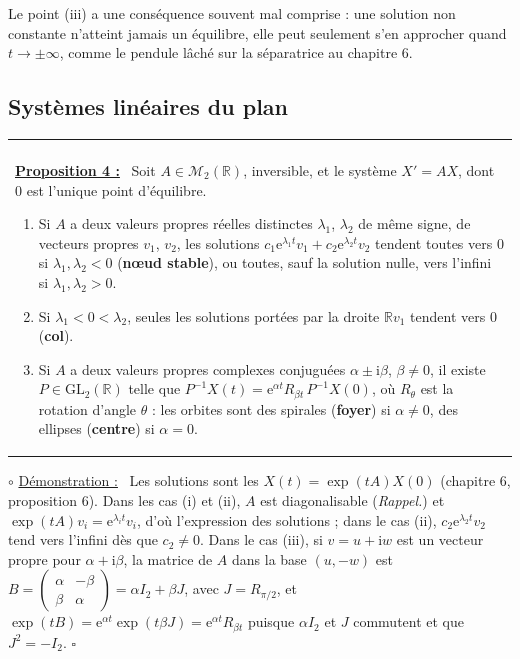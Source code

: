 \documentclass[a4paper,twoside]{report}
\makeatletter
\newcommand{\mot}[1]{\textcolor{rougecours}{\textbf{#1}}}
\newenvironment{cadre}%
 {\par\vspace{2mm}\noindent\begin{tabular}{|@{\hspace{4mm}}p{0.93\textwidth}@{\hspace{4mm}}|}
  \hline \\[-2mm]}%
 {\\[2mm] \hline \end{tabular}\par\vspace{3mm}}
\newcommand{\propo}[1]{\textbf{\underline{Proposition #1 :}}~}
\newenvironment{demo}%
 {\par\needspace{4\baselineskip}\vspace{1mm}\noindent$\circ$ \underline{Démonstration :}~\setlength{\parskip}{3pt plus 1pt}}%
 {\hfill$\square$\par\vspace{2mm}}
\newcommand{\R}{\mathbb{R}}
\newcommand{\ee}{\mathrm{e}}                      %
\newcommand{\ii}{\mathrm{i}}                      %
\newcommand{\GL}{\mathrm{GL}}                     %
\makeatother
\begin{document}
\noindent Le point (iii) a une conséquence souvent mal comprise : une solution non constante n'atteint jamais un équilibre, elle peut seulement s'en approcher quand $t \to \pm\infty$, comme le pendule lâché sur la séparatrice au chapitre 6.

\subsection{Systèmes linéaires du plan}

\begin{cadre}
\propo{4} Soit $A \in \mathcal{M}_{2}(\R)$, inversible, et le système $X' = AX$, dont $0$ est l'unique point d'équilibre.
\begin{enumerate}[label=(\roman*),topsep=3pt,itemsep=3pt]
  \item Si $A$ a deux valeurs propres réelles distinctes $\lambda_{1}$, $\lambda_{2}$ de même signe, de vecteurs propres $v_{1}$, $v_{2}$, les solutions $c_{1}\ee^{\lambda_{1}t}v_{1} + c_{2}\ee^{\lambda_{2}t}v_{2}$ tendent toutes vers $0$ si $\lambda_{1}, \lambda_{2} < 0$ (\mot{nœud stable}), ou toutes, sauf la solution nulle, vers l'infini si $\lambda_{1}, \lambda_{2} > 0$.
  \item Si $\lambda_{1} < 0 < \lambda_{2}$, seules les solutions portées par la droite $\R v_{1}$ tendent vers $0$ (\mot{col}).
  \item Si $A$ a deux valeurs propres complexes conjuguées $\alpha \pm \ii\beta$, $\beta \neq 0$, il existe $P \in \GL_{2}(\R)$ telle que $P^{-1}X(t) = \ee^{\alpha t}R_{\beta t}\,P^{-1}X(0)$, où $R_{\theta}$ est la rotation d'angle $\theta$ : les orbites sont des spirales (\mot{foyer}) si $\alpha \neq 0$, des ellipses (\mot{centre}) si $\alpha = 0$.
\end{enumerate}
\end{cadre}

\begin{demo}
Les solutions sont les $X(t) = \exp(tA)X(0)$ (chapitre 6, proposition 6). Dans les cas (i) et (ii), $A$ est diagonalisable (\emph{Rappel.}) et $\exp(tA)v_{i} = \ee^{\lambda_{i}t}v_{i}$, d'où l'expression des solutions ; dans le cas (ii), $c_{2}\ee^{\lambda_{2}t}v_{2}$ tend vers l'infini dès que $c_{2} \neq 0$. Dans le cas (iii), si $v = u + \ii w$ est un vecteur propre pour $\alpha + \ii\beta$, la matrice de $A$ dans la base $(u, -w)$ est $B = \begin{pmatrix} \alpha & -\beta \\ \beta & \alpha \end{pmatrix} = \alpha I_{2} + \beta J$, avec $J = R_{\pi/2}$, et $\exp(tB) = \ee^{\alpha t}\exp(t\beta J) = \ee^{\alpha t}R_{\beta t}$ puisque $\alpha I_{2}$ et $J$ commutent et que $J^{2} = -I_{2}$.
\end{demo}
\end{document}
